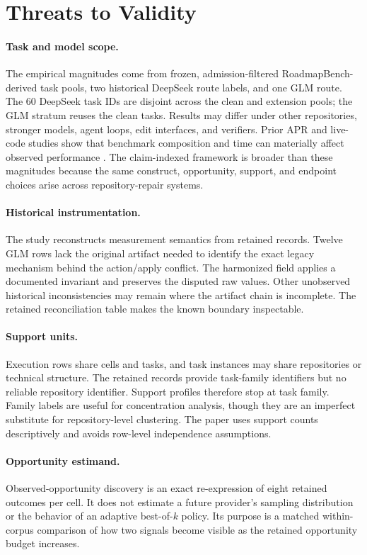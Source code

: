 \section{Threats to Validity}
\label{sec:threats}

\paragraph{Task and model scope.}
The empirical magnitudes come from frozen, admission-filtered RoadmapBench-derived task pools, two historical DeepSeek route labels, and one GLM route. The 60 DeepSeek task IDs are disjoint across the clean and extension pools; the GLM stratum reuses the clean tasks. Results may differ under other repositories, stronger models, agent loops, edit interfaces, and verifiers. Prior APR and live-code studies show that benchmark composition and time can materially affect observed performance \citep{durieux2019repairthemall,jain2025livecodebench}. The claim-indexed framework is broader than these magnitudes because the same construct, opportunity, support, and endpoint choices arise across repository-repair systems.

\paragraph{Historical instrumentation.}
The study reconstructs measurement semantics from retained records. Twelve GLM rows lack the original artifact needed to identify the exact legacy mechanism behind the action/apply conflict. The harmonized field applies a documented invariant and preserves the disputed raw values. Other unobserved historical inconsistencies may remain where the artifact chain is incomplete. The retained reconciliation table makes the known boundary inspectable.

\paragraph{Support units.}
Execution rows share cells and tasks, and task instances may share repositories or technical structure. The retained records provide task-family identifiers but no reliable repository identifier. Support profiles therefore stop at task family. Family labels are useful for concentration analysis, though they are an imperfect substitute for repository-level clustering. The paper uses support counts descriptively and avoids row-level independence assumptions.

\paragraph{Opportunity estimand.}
Observed-opportunity discovery is an exact re-expression of eight retained outcomes per cell. It does not estimate a future provider's sampling distribution or the behavior of an adaptive best-of-$k$ policy. Its purpose is a matched within-corpus comparison of how two signals become visible as the retained opportunity budget increases.

